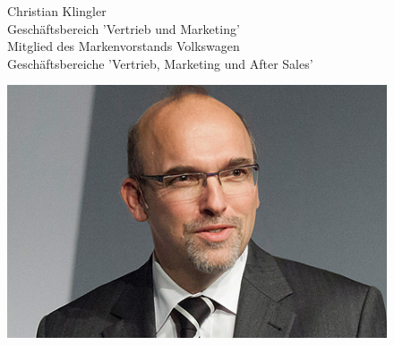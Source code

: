 \documentclass[12pt]{article}
\begin{document}
\begin{figure}[here!]
	\centering
	\begin{minipage}[h]{0.65\textwidth}
		Christian Klingler\\
		Geschäftsbereich 'Vertrieb und Marketing'\\
		Mitglied des Markenvorstands Volkswagen\\
		Geschäftsbereiche 'Vertrieb, Marketing und After Sales'
	\end{minipage}
	\begin{minipage}[h]{0.10\textwidth}
		\hspace{1cm} 
	\end{minipage}
	\begin{minipage}[h]{0.20\textwidth}
		\centering
		\includegraphics[width=1.0\textwidth]{images/ChristianKlingler.jpg}
		\label{fig:vorstandvw3}
		\cite{ckpic}
	\end{minipage}
\end{figure}
\end{document}
